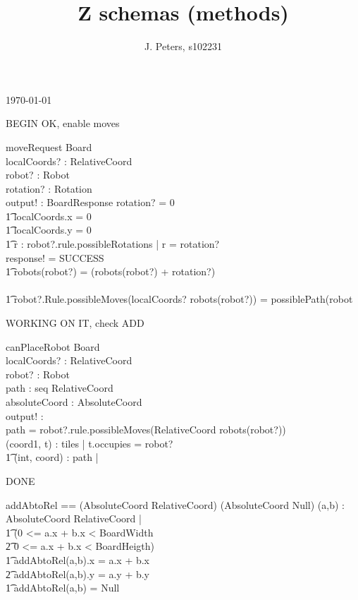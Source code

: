 \documentclass[a4paper,11pt]{article}
\begin{document}
\today
\title{Z schemas (methods)}
\author{J. Peters, s102231}
\maketitle

BEGIN OK, enable moves
\begin{schema}{moveRequest}
\Delta Board \\
localCoords? : RelativeCoord \\
robot? : Robot \\
rotation? : Rotation \\
output! : BoardResponse
\where
\IF rotation? \not = 0 \\ \t1 
localCoords.x = 0 \\ \t1
localCoords.y = 0 \\ \t1
 \exists r : robot?.rule.possibleRotations | r = rotation?\\
\THEN response! = SUCCESS \\ \t1
robots(robot?) = (robots(robot?) + rotation?)  \\
\ELSE \\ \t1
\IF robot?.Rule.possibleMoves(localCoords? \cross robots(robot?)) = possiblePath(robot
\end{schema}

WORKING ON IT, check ADD
\begin{schema}{canPlaceRobot}
\Xi Board \\
localCoords? : RelativeCoord \\
robot? : Robot \\
path : seq RelativeCoord \\
absoluteCoord : AbsoluteCoord \\
output! : \bool \\
\where
path = robot?.rule.possibleMoves(RelativeCoord \cross robots(robot?)) \\
\exists (coord1, t) : tiles | t.occupies = robot? \implies \\ \t1
\forall (int, coord) : path | 
\end{schema}

DONE
\begin{axdef}
addAbtoRel == (AbsoluteCoord \cross RelativeCoord) \rightarrow (AbsoluteCoord \union Null)
\where
\forall (a,b) : AbsoluteCoord \cross RelativeCoord | \\ \t1
\IF (0 <= a.x + b.x < BoardWidth \\ \t2
0 <= a.x + b.x < BoardHeigth) \\ \t1
\THEN 
addAbtoRel(a,b).x = a.x + b.x \\ \t2
addAbtoRel(a,b).y = a.y + b.y \\ \t1
\ELSE addAbtoRel(a,b) = Null
\end{axdef}
\end{document}

